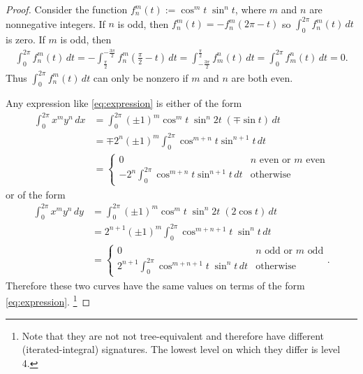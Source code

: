 \documentclass{scrartcl}
\theoremstyle{plain}
\theoremstyle{definition}
\newcommand{\1}[1]{1_{\{#1\}}}
\let\todon\todo
\newcommand{\todonotes}[1]{\todon{\color{red}#1}}
\renewcommand{\todo}[1]{ \textbf{\color{Orange}(#1)} }
\begin{document}
\begin{proof}

  
  Consider the function $f^m_n(t):=\cos^m t\;\sin^n t$, where $m$ and $n$ are nonnegative integers. If $n$ is odd, then $f^m_n(t)=-f^m_n(2\pi- t)$ so $\int_0^{2\pi}f^m_n(t)\,dt$ is zero. If $m$ is odd, then
  \begin{align*} \int_0^{2\pi}f^m_n(t)\,dt=-\int_{\frac\pi2}^{-\frac{3\pi}2}f^m_n(\frac\pi2-t)\,dt=\int^{\frac\pi2}_{-\frac{3\pi}2}f^n_m(t)\,dt=\int^{2\pi}_0f^n_m(t)\,dt=0.
\end{align*} 
  Thus $\int_0^{2\pi}f^m_n(t)\,dt$ can only be nonzero if $m$ and $n$ are both even. 
  
  Any expression like \eqref{eq:expression} is either of the form
  \begin{align*}
  \int_0^{2\pi}x^my^n\,dx&=\int_0^{2\pi}(\pm1)^m\cos^m t\;\sin^n 2t \;(\mp\sin t)\,dt
  \\&=\mp2^n(\pm1)^m\int_0^{2\pi}\cos^{m+n}t\sin^{n+1}t\,dt
\\&=\begin{cases}0&\text{$n$ even or $m$ even}\\-2^n\int_0^{2\pi}\cos^{m+n}t\sin^{n+1}t\,dt&\text{otherwise}\end{cases}
  \end{align*}
  or of the form
  \begin{align*}
  \int_0^{2\pi}x^my^n\,dy&=\int_0^{2\pi}(\pm1)^m\cos^m t\;\sin^n 2t \;(2\cos t)\,dt
  \\&=2^{n+1}(\pm1)^m\int_0^{2\pi}\cos^{m+n+1}t\;\sin^{n}t\,dt
  \\&=\begin{cases}0&\text{$n$ odd or $m$ odd}\\2^{n+1}\int_0^{2\pi}\cos^{m+n+1}t\;\sin^{n}t\,dt&\text{otherwise}\end{cases}.
  \end{align*}
  Therefore these two curves have the same
  values on terms of the form \eqref{eq:expression}.
  \footnote{
  Note that they are not not tree-equivalent and therefore have different (iterated-integral) signatures. The lowest level on which they differ is level 4.}
\end{proof}
\end{document}

